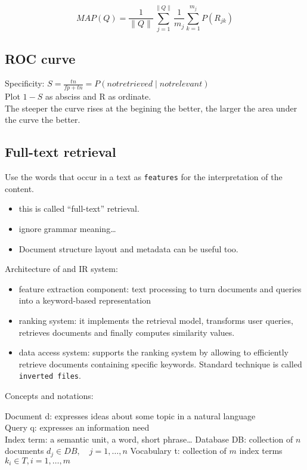 $$
MAP(Q) = \frac{1}{\|Q\|} \sum_{j = 1}^{\|Q\|} \frac{1}{m_j}
\sum_{k = 1}^{m_j} P(R_{jk})
$$

\subsection{ROC curve}

Specificity: $ S = \frac{tn}{fp + tn} = P(not retrieved \mid not
relevant) $ \\

Plot $ 1 - S $ as absciss and R as ordinate. \\
The steeper the curve rises at the begining the better, the larger the
area under the curve the better.

\subsection{Full-text retrieval}

Use the words that occur in a text as \texttt{features} for the
interpretation of the content.

\begin{itemize}
\item this is called ``full-text'' retrieval.
\item ignore grammar meaning\ldots
\item Document structure layout and metadata can be useful too.
\end{itemize}

Architecture of and IR system:
\begin{itemize}
\item feature extraction component: text processing to turn documents
  and queries into a keyword-based representation
\item ranking system: it implements the retrieval model, transforms
  user queries, retrieves documents and finally computes similarity
  values.
\item data access system: supports the ranking system by allowing to
  efficiently retrieve documents containing specific
  keywords. Standard technique is called \texttt{inverted files}.
\end{itemize}

Concepts and notations:

Document d: expresses ideas about some topic in a natural language \\
Query q: expresses an information need \\
Index term: a semantic unit, a word, short phrase\ldots
Database DB: collection of $n$ documents $ d_j \in DB, \quad j =
1,\ldots,n $
Vocabulary t: collection of $m$ index terms $ k_i \in T, i = 1,\ldots,m$

